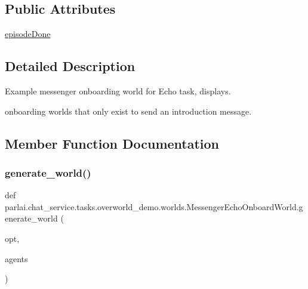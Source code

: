 \subsection*{Public Attributes}
\begin{DoxyCompactItemize}
\item 
\hyperlink{classparlai_1_1chat__service_1_1tasks_1_1overworld__demo_1_1worlds_1_1MessengerEchoOnboardWorld_a3a751645ae8e2548ef8de953e9905433}{episode\+Done}
\end{DoxyCompactItemize}


\subsection{Detailed Description}
\begin{DoxyVerb}Example messenger onboarding world for Echo task, displays.

onboarding worlds that only exist to send an introduction message.
\end{DoxyVerb}
 

\subsection{Member Function Documentation}
\mbox{\label{classparlai_1_1chat__service_1_1tasks_1_1overworld__demo_1_1worlds_1_1MessengerEchoOnboardWorld_ab579e33ffbc640197255282f56f6fed8}} 
\subsubsection{\texorpdfstring{generate\+\_\+world()}{generate\_world()}}
{\footnotesize\ttfamily def parlai.\+chat\+\_\+service.\+tasks.\+overworld\+\_\+demo.\+worlds.\+Messenger\+Echo\+Onboard\+World.\+generate\+\_\+world (\begin{DoxyParamCaption}\item[{}]{opt,  }\item[{}]{agents }\end{DoxyParamCaption})\hspace{0.3cm}{\ttfamily [static]}}

